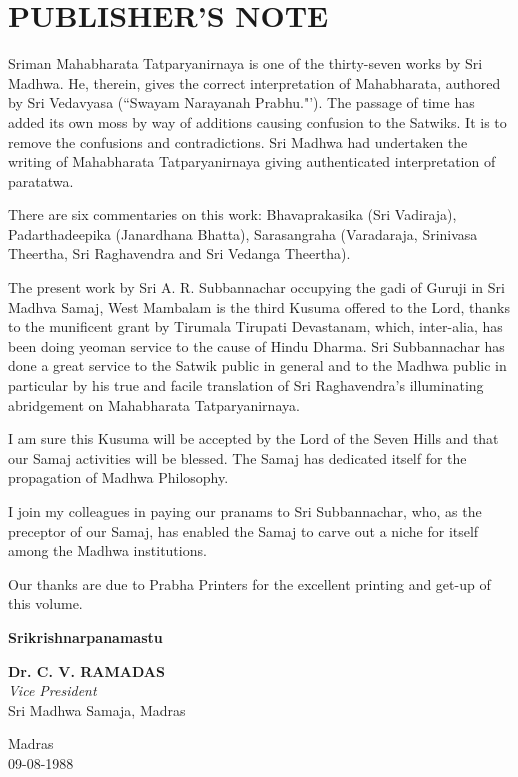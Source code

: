 
\chapter*{PUBLISHER'S NOTE}

Sriman Mahabharata Tatparyanirnaya is one of the thirty-seven works by Sri Madhwa. He, therein, gives the correct interpretation of Mahabharata, authored by Sri Vedavyasa (“Swayam Narayanah Prabhu."'). The passage of time has added its own moss by way of additions causing confusion to the Satwiks. It is to remove the confusions and contradictions. Sri Madhwa had undertaken the writing of Mahabharata Tatparyanirnaya giving authenticated interpretation of paratatwa.

There are six commentaries on this work: Bhavaprakasika (Sri Vadiraja), Padarthadeepika (Janardhana Bhatta), Sarasangraha (Varadaraja, Srinivasa Theertha, Sri Raghavendra and Sri Vedanga Theertha).

The present work by Sri A. R. Subbannachar occupying the gadi of Guruji in Sri Madhva Samaj, West Mambalam is the third Kusuma offered to the Lord, thanks to the munificent grant by Tirumala Tirupati Devastanam, which, inter-alia, has been doing yeoman service to the cause of Hindu Dharma. Sri Subbannachar has done a great service to the Satwik public in general and to the Madhwa public in particular by his true and facile translation of Sri Raghavendra's illuminating abridgement on Mahabharata Tatparyanirnaya.

I am sure this Kusuma will be accepted by the Lord of the Seven Hills and that our Samaj activities will be blessed. The Samaj has dedicated itself for the propagation of Madhwa Philosophy.

I join my colleagues in paying our pranams to Sri Subbannachar, who, as the preceptor of our Samaj, has enabled the Samaj to carve out a niche for itself among the Madhwa institutions.

Our thanks are due to Prabha Printers for the excellent printing and get-up of this volume.

\begin{center}
\textbf{Srikrishnarpanamastu}
\end{center}

\begin{flushright}
\textbf{Dr. C. V. RAMADAS}\\\textit{Vice President}\\ Sri Madhwa Samaja, Madras
\end{flushright}

\begin{flushleft}
Madras \\ 09-08-1988
\end{flushleft}

